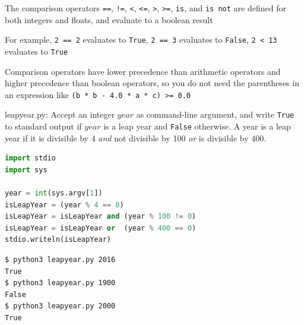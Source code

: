 \documentclass[8pt,a4paper,compress]{beamer}
\begin{document}
\begin{frame}[fragile]
\pause

The comparison operators \lstinline{==}, \lstinline{!=}, \lstinline{<}, \lstinline{<=}, \lstinline{>}, \lstinline{>=}, \lstinline{is}, and \lstinline{is not} are defined for both integers and floats, and evaluate to a boolean result

\pause
\bigskip

For example, \lstinline{2 == 2} evaluates to \lstinline{True}, \lstinline{2 == 3} evaluates to \lstinline{False}, \lstinline{2 < 13} evaluates to \lstinline{True} 

\pause
\bigskip

Comparison operators have lower precedence than arithmetic operators and higher precedence than boolean operators, so you do not need the parentheses in an expression like \lstinline{(b * b - 4.0 * a * c) >= 0.0}
\end{frame}

\begin{frame}[fragile]
\pause

\begin{framed}
\tiny leapyear.py: Accept an integer $year$ as command-line argument, and write \lstinline{True} to standard output if $year$ is a leap year and \lstinline{False} otherwise. A year is a leap year if it is divisible by 4 \emph{and} not divisible by 100 \emph{or} is divisible by 400.
\end{framed}

\begin{lstlisting}[language=Python]
import stdio
import sys

year = int(sys.argv[1])
isLeapYear = (year % 4 == 0)
isLeapYear = isLeapYear and (year % 100 != 0)
isLeapYear = isLeapYear or  (year % 400 == 0)
stdio.writeln(isLeapYear)
\end{lstlisting}

\pause

\begin{lstlisting}[language={}]
$ python3 leapyear.py 2016
True
$ python3 leapyear.py 1900
False
$ python3 leapyear.py 2000
True
\end{lstlisting}
\end{frame}
\end{document}
